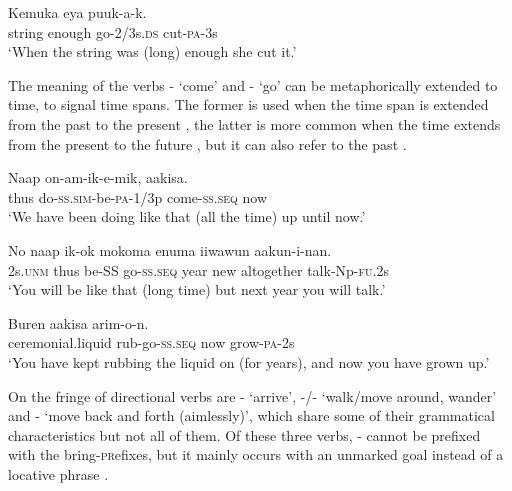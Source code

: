 \ea%
\label{ex:3:x289}
\gll Kemuka  eya puuk-a-k. \\
string enough go-2/3s.\textsc{ds} cut-\textsc{pa}-3s \\
\glt`When the string was (long) enough she cut it.'
\z

The meaning of the verbs - `come' and - `go' can be metaphorically extended to time, to signal time spans. The former is used when the time span is extended from the past to the present , the latter is more common when the time extends from the present to the future , but it can also refer to the past .

\ea%
\label{ex:3:x290}
\gll Naap on-am-ik-e-mik,   aakisa. \\
thus do-\textsc{ss}.\textsc{sim}-be-\textsc{pa}-1/3p come-\textsc{ss}.\textsc{seq} now\\
\glt`We have been doing like that (all the time) up until now.'
\z

\ea%
\label{ex:3:x437}
\gll No naap ik-ok  mokoma enuma iiwawun aakun-i-nan.\\
2s.\textsc{unm} thus be-SS go-\textsc{ss}.\textsc{seq} year new altogether talk-Np-\textsc{fu}.2s\\
\glt`You will be like that (long time) but next year you will talk.'
\z

\ea%
\label{ex:3:x291}
\gll Buren \textstyleEmphasizedVernacularWords{(}\textstyleEmphasizedVernacularWords{)} aakisa arim-o-n. \\
ceremonial.liquid rub-go-\textsc{ss}.\textsc{seq} now grow-\textsc{pa}-2s \\
\glt`You have kept rubbing the \textit{} liquid on (for years), and now you have grown up.'
\z

On the fringe of directional verbs are - `arrive', -/- `walk/move around, wander' and - `move back and forth (aimlessly)', which share some of their grammatical characteristics but not all of them. Of these three verbs, - cannot be prefixed with the bring-\textsc{pr}efixes, but it mainly occurs with an unmarked goal instead of a locative phrase .

